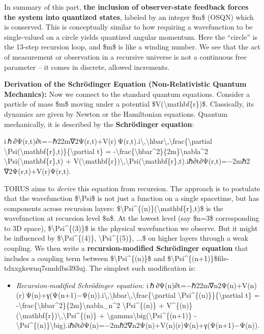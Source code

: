In summary of this part, \textbf{the inclusion of observer-state
feedback forces the system into quantized states}, labeled by an integer
\$m\$ (OSQN) which is conserved. This is conceptually similar to how
requiring a wavefunction to be single-valued on a circle yields
quantized angular momentum. Here the ``circle'' is the 13-step recursion
loop, and \$m\$ is like a winding number​. We see that the act of
measurement or observation in a recursive universe is not a continuous
free parameter -- it comes in discrete, allowed increments.

\textbf{Derivation of the Schrödinger Equation (Non-Relativistic Quantum
Mechanics):} Now we connect to the standard quantum equations. Consider
a particle of mass \$m\$ moving under a potential
\$V(\textbackslash{}mathbf\{r\})\$. Classically, its dynamics are given
by Newton or the Hamiltonian equations. Quantum mechanically, it is
described by the \textbf{Schrödinger equation}:

i ℏ ∂Ψ(r,t)∂t=−ℏ22m∇2Ψ(r,t)+V(r) Ψ(r,t).i\textbackslash{},\textbackslash{}hbar\textbackslash{},\textbackslash{}frac\{\textbackslash{}partial
\textbackslash{}Psi(\textbackslash{}mathbf\{r\},t)\}\{\textbackslash{}partial
t\} =
-\textbackslash{}frac\{\textbackslash{}hbar\^{}2\}\{2m\}\textbackslash{}nabla\^{}2
\textbackslash{}Psi(\textbackslash{}mathbf\{r\},t) +
V(\textbackslash{}mathbf\{r\})\textbackslash{},\textbackslash{}Psi(\textbackslash{}mathbf\{r\},t).iℏ∂t∂Ψ(r,t)​=−2mℏ2​∇2Ψ(r,t)+V(r)Ψ(r,t).

TORUS aims to \emph{derive} this equation from recursion. The approach
is to postulate that the wavefunction \$\textbackslash{}Psi\$ is not
just a function on a single spacetime, but has components across
recursion layers:
\$\textbackslash{}Psi\^{}\{(n)\}(\textbackslash{}mathbf\{r\},t)\$ is the
wavefunction at recursion level \$n\$. At the lowest level (say \$n=3\$
corresponding to 3D space), \$\textbackslash{}Psi\^{}\{(3)\}\$ is the
physical wavefunction we observe. But it might be influenced by
\$\textbackslash{}Psi\^{}\{(4)\}, \textbackslash{}Psi\^{}\{(5)\}, ...\$
on higher layers through a weak coupling. We then write a
\textbf{recursion-modified Schrödinger equation} that includes a
coupling term between \$\textbackslash{}Psi\^{}\{(n)\}\$ and
\$\textbackslash{}Psi\^{}\{(n+1)\}\$​file-tdxxgkswnq7smddbs393uj. The
simplest such modification is:

\begin{itemize}
\item
  \emph{Recursion-modified Schrödinger equation:}
  i ℏ ∂Ψ(n)∂t=−ℏ22m∇n2Ψ(n)+V(n)(r) Ψ(n)+γ(Ψ(n+1)−Ψ(n)).i\textbackslash{},\textbackslash{}hbar\textbackslash{},\textbackslash{}frac\{\textbackslash{}partial
  \textbackslash{}Psi\^{}\{(n)\}\}\{\textbackslash{}partial t\} =
  -\textbackslash{}frac\{\textbackslash{}hbar\^{}2\}\{2m\}\textbackslash{}nabla\_n\^{}2
  \textbackslash{}Psi\^{}\{(n)\} +
  V\^{}\{(n)\}(\textbackslash{}mathbf\{r\})\textbackslash{},\textbackslash{}Psi\^{}\{(n)\}
  +
  \textbackslash{}gamma\textbackslash{}big(\textbackslash{}Psi\^{}\{(n+1)\}
  -
  \textbackslash{}Psi\^{}\{(n)\}\textbackslash{}big).iℏ∂t∂Ψ(n)​=−2mℏ2​∇n2​Ψ(n)+V(n)(r)Ψ(n)+γ(Ψ(n+1)−Ψ(n)).
\end{itemize}

